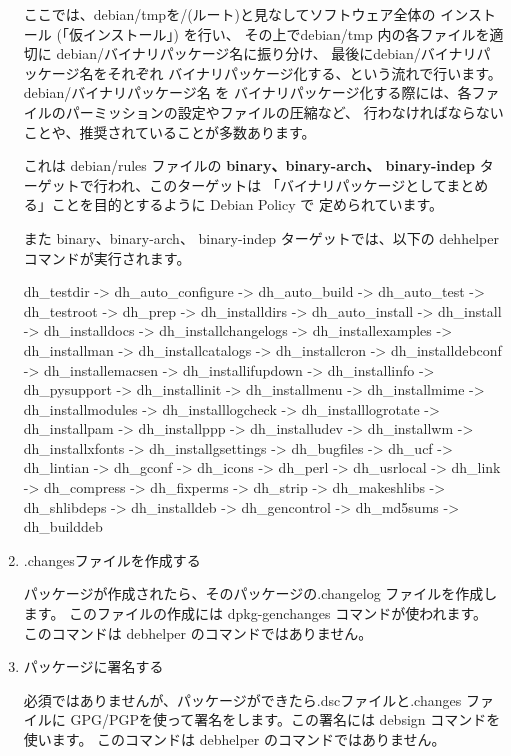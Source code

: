 \documentclass[mingoth,a4paper]{jsarticle}
\begin{document}
\begin{enumerate}
ここでは、debian/tmpを/(ルート)と見なしてソフトウェア全体の
インストール (「仮インストール」) を行い、 その上でdebian/tmp 内の各ファイルを適切に
debian/バイナリパッケージ名に振り分け、 最後にdebian/バイナリパッケージ名をそれぞれ
バイナリパッケージ化する、という流れで行います。 debian/バイナリパッケージ名 を
バイナリパッケージ化する際には、各ファイルのパーミッションの設定やファイルの圧縮など、
行わなければならないことや、推奨されていることが多数あります。 

これは debian/rules ファイルの {\bf binary、binary-arch、 binary-indep} 
ターゲットで行われ、このターゲットは
「バイナリパッケージとしてまとめる」ことを目的とするように Debian Policy で
定められています。

また binary、binary-arch、 binary-indep ターゲットでは、以下の dehhelper コマンドが実行されます。
\begin{commandline}
dh_testdir -> dh_auto_configure -> dh_auto_build -> dh_auto_test -> dh_testroot
-> dh_prep -> dh_installdirs -> dh_auto_install -> dh_install -> dh_installdocs
-> dh_installchangelogs -> dh_installexamples -> dh_installman -> dh_installcatalogs
-> dh_installcron -> dh_installdebconf -> dh_installemacsen -> dh_installifupdown
-> dh_installinfo -> dh_pysupport -> dh_installinit -> dh_installmenu -> dh_installmime
-> dh_installmodules -> dh_installlogcheck -> dh_installlogrotate -> dh_installpam
-> dh_installppp -> dh_installudev -> dh_installwm -> dh_installxfonts -> dh_installgsettings
-> dh_bugfiles -> dh_ucf -> dh_lintian -> dh_gconf -> dh_icons -> dh_perl -> dh_usrlocal
-> dh_link -> dh_compress -> dh_fixperms -> dh_strip -> dh_makeshlibs -> dh_shlibdeps
-> dh_installdeb -> dh_gencontrol -> dh_md5sums -> dh_builddeb
\end{commandline}

\item .changesファイルを作成する

パッケージが作成されたら、そのパッケージの.changelog ファイルを作成します。
このファイルの作成には dpkg-genchanges コマンドが使われます。
このコマンドは debhelper のコマンドではありません。
\item パッケージに署名する

必須ではありませんが、パッケージができたら.dscファイルと.changes ファイルに
GPG/PGPを使って署名をします。この署名には debsign コマンドを使います。
このコマンドは debhelper のコマンドではありません。
\end{enumerate}
\end{document}
